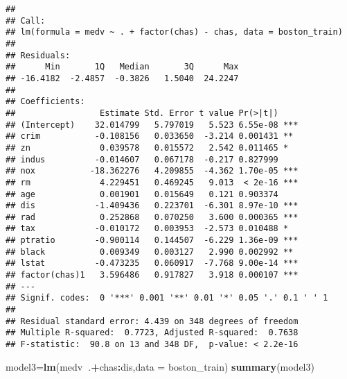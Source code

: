 \documentclass[
]{article}
\newenvironment{Shaded}{\begin{snugshade}}{\end{snugshade}}
\newcommand{\DataTypeTok}[1]{\textcolor[rgb]{0.13,0.29,0.53}{#1}}
\newcommand{\KeywordTok}[1]{\textcolor[rgb]{0.13,0.29,0.53}{\textbf{#1}}}
\newcommand{\NormalTok}[1]{#1}
\newcommand{\OperatorTok}[1]{\textcolor[rgb]{0.81,0.36,0.00}{\textbf{#1}}}
\begin{document}
\begin{verbatim}
## 
## Call:
## lm(formula = medv ~ . + factor(chas) - chas, data = boston_train)
## 
## Residuals:
##      Min       1Q   Median       3Q      Max 
## -16.4182  -2.4857  -0.3826   1.5040  24.2247 
## 
## Coefficients:
##                 Estimate Std. Error t value Pr(>|t|)    
## (Intercept)    32.014799   5.797019   5.523 6.55e-08 ***
## crim           -0.108156   0.033650  -3.214 0.001431 ** 
## zn              0.039578   0.015572   2.542 0.011465 *  
## indus          -0.014607   0.067178  -0.217 0.827999    
## nox           -18.362276   4.209855  -4.362 1.70e-05 ***
## rm              4.229451   0.469245   9.013  < 2e-16 ***
## age             0.001901   0.015649   0.121 0.903374    
## dis            -1.409436   0.223701  -6.301 8.97e-10 ***
## rad             0.252868   0.070250   3.600 0.000365 ***
## tax            -0.010172   0.003953  -2.573 0.010488 *  
## ptratio        -0.900114   0.144507  -6.229 1.36e-09 ***
## black           0.009349   0.003127   2.990 0.002992 ** 
## lstat          -0.473235   0.060917  -7.768 9.00e-14 ***
## factor(chas)1   3.596486   0.917827   3.918 0.000107 ***
## ---
## Signif. codes:  0 '***' 0.001 '**' 0.01 '*' 0.05 '.' 0.1 ' ' 1
## 
## Residual standard error: 4.439 on 348 degrees of freedom
## Multiple R-squared:  0.7723, Adjusted R-squared:  0.7638 
## F-statistic:  90.8 on 13 and 348 DF,  p-value: < 2.2e-16
\end{verbatim}

\begin{Shaded}
\begin{Highlighting}[]
\NormalTok{model3=}\KeywordTok{lm}\NormalTok{(medv}\OperatorTok{~}\NormalTok{.}\OperatorTok{+}\NormalTok{chas}\OperatorTok{:}\NormalTok{dis,}\DataTypeTok{data =}\NormalTok{ boston_train)}
\KeywordTok{summary}\NormalTok{(model3)}
\end{Highlighting}
\end{Shaded}
\end{document}
